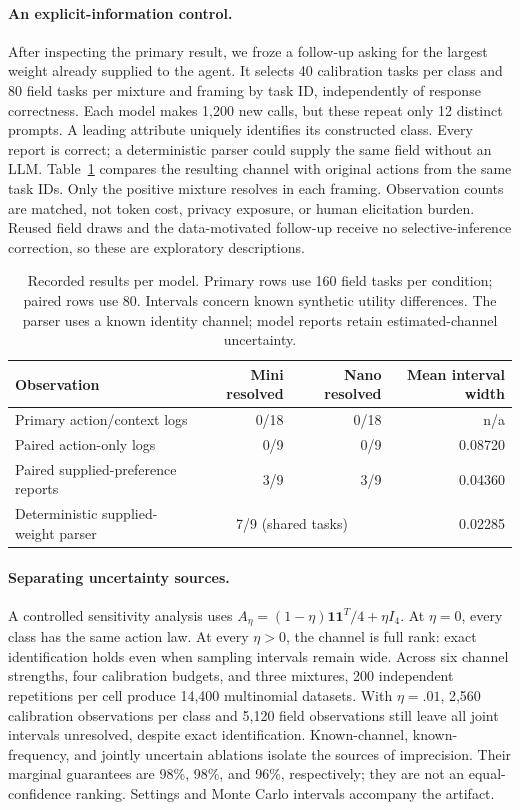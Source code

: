 \documentclass[manuscript,review,anonymous]{acmart}
\begin{document}
\paragraph{An explicit-information control.}
After inspecting the primary result, we froze a follow-up asking for the largest weight already supplied to the agent. It selects 40 calibration tasks per class and 80 field tasks per mixture and framing by task ID, independently of response correctness. Each model makes 1,200 new calls, but these repeat only 12 distinct prompts. A leading attribute uniquely identifies its constructed class. Every report is correct; a deterministic parser could supply the same field without an LLM. Table~\ref{tab:result} compares the resulting channel with original actions from the same task IDs. Only the positive mixture resolves in each framing. Observation counts are matched, not token cost, privacy exposure, or human elicitation burden. Reused field draws and the data-motivated follow-up receive no selective-inference correction, so these are exploratory descriptions.

\begin{table}[t]
\centering
\caption{Recorded results per model. Primary rows use 160 field tasks per condition; paired rows use 80. Intervals concern known synthetic utility differences. The parser uses a known identity channel; model reports retain estimated-channel uncertainty.}
\label{tab:result}
\begin{tabular}{lrrr}
\toprule Observation & Mini resolved & Nano resolved & Mean interval width \\\midrule
Primary action/context logs & 0/18 & 0/18 & n/a \\
Paired action-only logs & 0/9 & 0/9 & 0.08720 \\
Paired supplied-preference reports & 3/9 & 3/9 & 0.04360 \\
Deterministic supplied-weight parser & \multicolumn{2}{c}{7/9 (shared tasks)} & 0.02285 \\\bottomrule
\end{tabular}
\end{table}

\paragraph{Separating uncertainty sources.}
A controlled sensitivity analysis uses $A_\eta=(1-\eta)\mathbf1\mathbf1^T/4+\eta I_4$. At $\eta=0$, every class has the same action law. At every $\eta>0$, the channel is full rank: exact identification holds even when sampling intervals remain wide. Across six channel strengths, four calibration budgets, and three mixtures, 200 independent repetitions per cell produce 14,400 multinomial datasets. With $\eta=.01$, 2,560 calibration observations per class and 5,120 field observations still leave all joint intervals unresolved, despite exact identification. Known-channel, known-frequency, and jointly uncertain ablations isolate the sources of imprecision. Their marginal guarantees are 98\%, 98\%, and 96\%, respectively; they are not an equal-confidence ranking. Settings and Monte Carlo intervals accompany the artifact.
\end{document}
